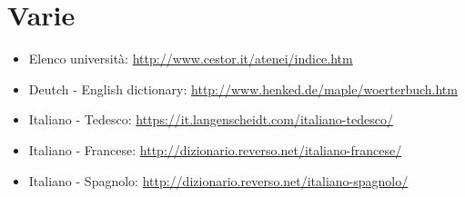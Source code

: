 \documentclass[a4paper,10pt]{article}
\begin{document}
\section{Varie}
\begin{itemize}
 \item Elenco università: \url{http://www.cestor.it/atenei/indice.htm}
 \item Deutch - English dictionary: \url{http://www.henked.de/maple/woerterbuch.htm}
 \item Italiano - Tedesco: \url{https://it.langenscheidt.com/italiano-tedesco/}
 \item Italiano - Francese: \url{http://dizionario.reverso.net/italiano-francese/}
 \item Italiano - Spagnolo: \url{http://dizionario.reverso.net/italiano-spagnolo/}
\end{itemize}
\end{document}
